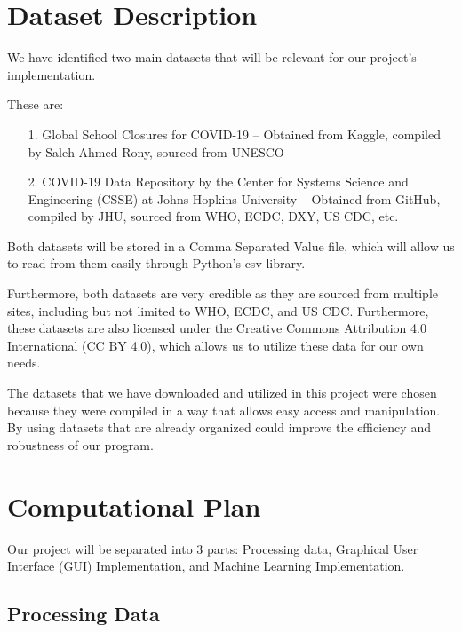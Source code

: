 \documentclass[fontsize=11pt]{article}
\begin{document}
\newpage

\section*{Dataset Description}

We have identified two main datasets that will be relevant for our project’s implementation.

These are:

\begin{enumerate}
    \item [1. ]
          Global School Closures for COVID-19 – Obtained from Kaggle, compiled by Saleh Ahmed Rony, sourced from UNESCO

    \item [2. ]
          COVID-19 Data Repository by the Center for Systems Science and Engineering (CSSE) at Johns Hopkins University – Obtained from GitHub, compiled by JHU, sourced from WHO, ECDC, DXY, US CDC, etc.
\end{enumerate}

Both datasets will be stored in a Comma Separated Value file, which will allow us to read from them easily through Python’s csv library.

Furthermore, both datasets are very credible as they are sourced from multiple sites, including but not limited to WHO, ECDC, and US CDC. Furthermore, these datasets are also licensed under the Creative Commons Attribution 4.0 International (CC BY 4.0), which allows us to utilize these data for our own needs.

The datasets that we have downloaded and utilized in this project were chosen because they were compiled in a way that allows easy access and manipulation. By using datasets that are already organized could improve the efficiency and robustness of our program.

\newpage


\section*{Computational Plan}

Our project will be separated into 3 parts: Processing data, Graphical User Interface (GUI) Implementation, and Machine Learning Implementation.

\subsection*{Processing Data}
\end{document}
